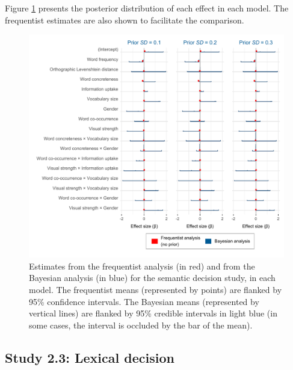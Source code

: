 \documentclass[
  12pt,
  man,floatsintext]{apa7}
\begin{document}
\clearpage

Figure \ref{fig:semanticdecision-frequentist-bayesian-plot-allpriors-exgaussian} presents the posterior distribution of each effect in each model. The frequentist estimates are also shown to facilitate the comparison.

\begin{figure}

{\centering \includegraphics[width=1\linewidth]{../semanticdecision/frequentist_bayesian_plots/plots/semanticdecision_frequentist_bayesian_plot_allpriors_exgaussian} 

}

\caption{Estimates from the frequentist analysis (in red) and from the Bayesian analysis (in blue) for the semantic decision study, in each model. The frequentist means (represented by points) are flanked by 95\% confidence intervals. The Bayesian means (represented by vertical lines) are flanked by 95\% credible intervals in light blue (in some cases, the interval is occluded by the bar of the mean).}\label{fig:semanticdecision-frequentist-bayesian-plot-allpriors-exgaussian}
\end{figure}

\clearpage

\hypertarget{study-2.3-lexical-decision-4}{%
\subsection{Study 2.3: Lexical decision}\label{study-2.3-lexical-decision-4}}
\end{document}
